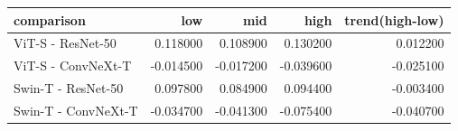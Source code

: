 \begin{tabular}{lrrrr}
\toprule
comparison & low & mid & high & trend(high-low) \\
\midrule
ViT-S - ResNet-50 & 0.118000 & 0.108900 & 0.130200 & 0.012200 \\
ViT-S - ConvNeXt-T & -0.014500 & -0.017200 & -0.039600 & -0.025100 \\
Swin-T - ResNet-50 & 0.097800 & 0.084900 & 0.094400 & -0.003400 \\
Swin-T - ConvNeXt-T & -0.034700 & -0.041300 & -0.075400 & -0.040700 \\
\bottomrule
\end{tabular}
